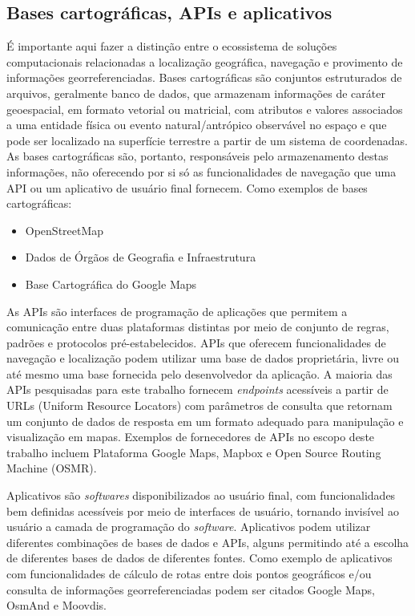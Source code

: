\documentclass[oneside,openright,12pt]{ufsm_2015} %
\begin{document}
\subsection{Bases cartográficas, APIs e aplicativos}
É importante aqui fazer a distinção entre o ecossistema de soluções computacionais relacionadas a localização geográfica, navegação e provimento de informações georreferenciadas.
Bases cartográficas são conjuntos estruturados de arquivos, geralmente banco de dados, que armazenam informações de caráter geoespacial, em formato vetorial ou matricial, com atributos e valores associados a uma entidade física ou evento natural/antrópico observável no espaço e que pode ser localizado na superfície terrestre a partir de um sistema de coordenadas. 
As bases cartográficas são, portanto, responsáveis pelo armazenamento destas informações, não oferecendo por si só as funcionalidades de navegação que uma API ou um aplicativo de usuário final fornecem. 
Como exemplos de bases cartográficas:

\begin{itemize}
    \item OpenStreetMap
    \item Dados de Órgãos de Geografia e Infraestrutura
    \item Base Cartográfica do Google Maps
\end{itemize}

As APIs são interfaces de programação de aplicações que permitem a comunicação entre duas plataformas distintas por meio de conjunto de regras, padrões e protocolos pré-estabelecidos. 
APIs que oferecem funcionalidades de navegação e localização podem utilizar uma base de dados proprietária, livre ou até mesmo uma base fornecida pelo desenvolvedor da aplicação. 
A maioria das APIs pesquisadas para este trabalho fornecem \textit{endpoints} acessíveis a partir de URLs (Uniform Resource Locators) com parâmetros de consulta que retornam um conjunto de dados de resposta em um formato adequado para manipulação e visualização em mapas. 
Exemplos de fornecedores de APIs no escopo deste trabalho incluem Plataforma Google Maps, Mapbox e Open Source Routing Machine (OSMR).

Aplicativos são \textit{softwares} disponibilizados ao usuário final, com funcionalidades bem definidas acessíveis por meio de interfaces de usuário, tornando invisível ao usuário a camada de programação do \textit{software}. 
Aplicativos podem utilizar diferentes combinações de bases de dados e APIs, alguns permitindo até a escolha de diferentes bases de dados de diferentes fontes. 
Como exemplo de aplicativos com funcionalidades de cálculo de rotas entre dois pontos geográficos e/ou consulta de informações georreferenciadas podem ser citados Google Maps,  OsmAnd e Moovdis.
\end{document}
